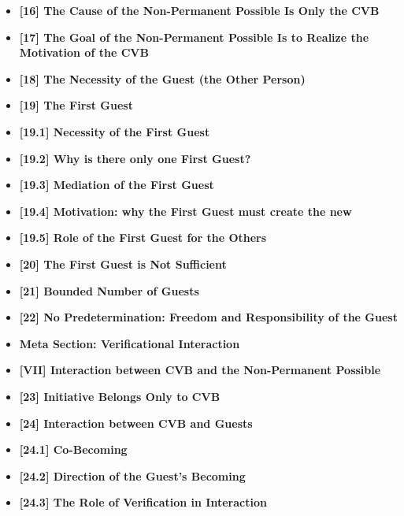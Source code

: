 \documentclass[12pt]{article}
\begin{document}
\begin{itemize}
\item \textbf{[16] The Cause of the Non-Permanent Possible Is Only the CVB}

\item \textbf{[17] The Goal of the Non-Permanent Possible Is to Realize the Motivation of the CVB}

\item \textbf{[18] The Necessity of the Guest (the Other Person)}

\item \textbf{[19] The First Guest}

\item \textbf{[19.1] Necessity of the First Guest}

\item \textbf{[19.2] Why is there only one First Guest?}

\item \textbf{[19.3] Mediation of the First Guest}

\item \textbf{[19.4] Motivation: why the First Guest must create the new}

\item \textbf{[19.5] Role of the First Guest for the Others}

\item \textbf{[20] The First Guest is Not Sufficient}

\item \textbf{[21] Bounded Number of Guests}

\item \textbf{[22] No Predetermination: Freedom and Responsibility of the Guest}

\item \textbf{Meta Section: Verificational Interaction}

\item \textbf{[VII] Interaction between CVB and the Non-Permanent Possible}

\item \textbf{[23] Initiative Belongs Only to CVB}

\item \textbf{[24] Interaction between CVB and Guests}

\item \textbf{[24.1] Co-Becoming}

\item \textbf{[24.2] Direction of the Guest’s Becoming}

\item \textbf{[24.3] The Role of Verification in Interaction}


\end{itemize}
\end{document}
